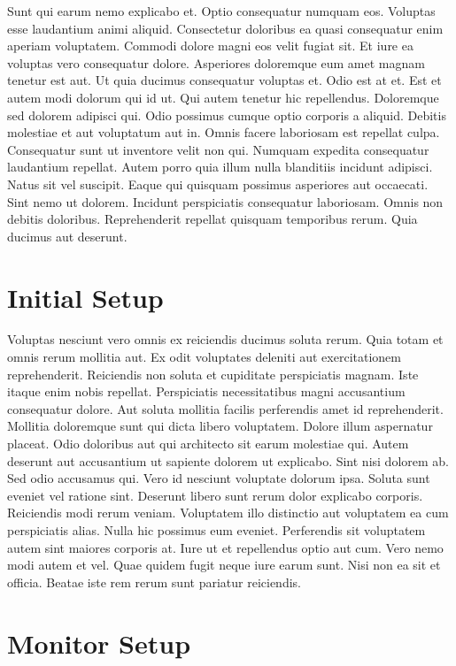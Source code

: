 \documentclass[
	11pt, %
	fleqn, %
	letterpaper, %
]{CommodoreBlueBook}
\begin{document}
Sunt qui earum nemo explicabo et. Optio consequatur numquam eos. Voluptas esse
laudantium animi aliquid. Consectetur doloribus ea quasi consequatur enim
aperiam voluptatem. Commodi dolore magni eos velit fugiat sit. Et iure ea
voluptas vero consequatur dolore. Asperiores doloremque eum amet magnam tenetur
est aut. Ut quia ducimus consequatur voluptas et. Odio est at et. Est et autem
modi dolorum qui id ut. Qui autem tenetur hic repellendus. Doloremque sed
dolorem adipisci qui. Odio possimus cumque optio corporis a aliquid. Debitis
molestiae et aut voluptatum aut in. Omnis facere laboriosam est repellat culpa.
Consequatur sunt ut inventore velit non qui. Numquam expedita consequatur
laudantium repellat. Autem porro quia illum nulla blanditiis incidunt adipisci.
Natus sit vel suscipit. Eaque qui quisquam possimus asperiores aut occaecati.
Sint nemo ut dolorem. Incidunt perspiciatis consequatur laboriosam. Omnis non
debitis doloribus. Reprehenderit repellat quisquam temporibus rerum. Quia
ducimus aut deserunt.

\chapter*{Initial Setup}

Voluptas nesciunt vero omnis ex reiciendis ducimus soluta rerum. Quia totam et
omnis rerum mollitia aut. Ex odit voluptates deleniti aut exercitationem
reprehenderit. Reiciendis non soluta et cupiditate perspiciatis magnam. Iste
itaque enim nobis repellat. Perspiciatis necessitatibus magni accusantium
consequatur dolore. Aut soluta mollitia facilis perferendis amet id
reprehenderit. Mollitia doloremque sunt qui dicta libero voluptatem. Dolore
illum aspernatur placeat. Odio doloribus aut qui architecto sit earum molestiae
qui. Autem deserunt aut accusantium ut sapiente dolorem ut explicabo. Sint nisi
dolorem ab. Sed odio accusamus qui. Vero id nesciunt voluptate dolorum ipsa.
Soluta sunt eveniet vel ratione sint. Deserunt libero sunt rerum dolor
explicabo corporis. Reiciendis modi rerum veniam. Voluptatem illo distinctio
aut voluptatem ea cum perspiciatis alias. Nulla hic possimus eum eveniet.
Perferendis sit voluptatem autem sint maiores corporis at. Iure ut et
repellendus optio aut cum. Vero nemo modi autem et vel. Quae quidem fugit neque
iure earum sunt. Nisi non ea sit et officia. Beatae iste rem rerum sunt
pariatur reiciendis.

\chapter*{Monitor Setup}
\end{document}
